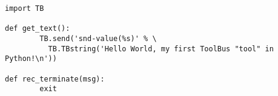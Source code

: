 \begin{verbatim}
import TB

def get_text():
        TB.send('snd-value(%s)' % \
          TB.TBstring('Hello World, my first ToolBus "tool" in Python!\n'))

def rec_terminate(msg):
        exit
\end{verbatim}
